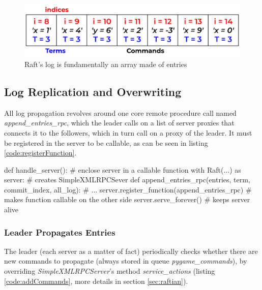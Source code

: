 \begin{figure}[h]
  \centering
  \includegraphics[width=.8\linewidth]{images/logStructure.png}
  
  \caption{Raft's log is fundamentally an array made of entries}
  \label{fig:logStructure}
\end{figure}

\subsection{Log Replication and Overwriting} \label{sec:logReplication}

All log propagation revolves around one core remote procedure call named \textit{append\_entries\_rpc}, which the leader calls on a list of server proxies that connects it to the followers, which in turn call on a proxy of the leader. It must be registered in the server to be callable, as can be seen in listing \ref{code:registerFunction}.

\begin{python}[label={code:registerFunction}, caption={Register, thus making it callable, the remote procedure call \textit{append\_entries\_rpc}}]
def handle_server():                                    # enclose server in a callable function
    with Raft(...) as server:                           # creates SimpleXMLRPCSever
        def append_entries_rpc(entries, term, commit_index, all_log):
            # ...
        server.register_function(append_entries_rpc)    # makes function callable on the other side
        server.serve_forever()                          # keeps server alive 
\end{python}

\subsubsection{Leader Propagates Entries} \label{sec:leaderSends}

The leader (each server as a matter of fact) periodically checks whether there are new commands to propagate (always stored in queue \textit{pygame\_commands}), by overriding \textit{SimpleXMLRPCServer}'s method \textit{service\_actions} (listing \ref{code:addCommands}, more details in section \ref{sec:raftian}).

